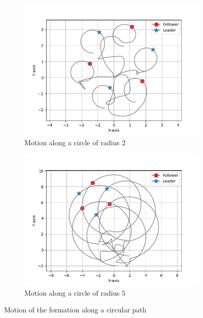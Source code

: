 \documentclass[a4paper,11pt,oneside]{book}
\begin{document}
\begin{figure}[h]
\centering
	\begin{subfigure}{0.49\textwidth}	
	\includegraphics[width=\textwidth]{Moving_hexagon_formation_circle_r_2.jpg}
	\caption{Motion along a circle of radius $2$}
	\end{subfigure}
\hfill
	\begin{subfigure}{0.49\textwidth}	
	\includegraphics[width=\textwidth]{Moving_hexagon_formation_circle_r_5.jpg}
	\caption{Motion along a circle of radius $5$}
	\end{subfigure}
\caption{Motion of the formation along a circular path}
\label{Formation_motion_circle}
\end{figure}
\end{document}
